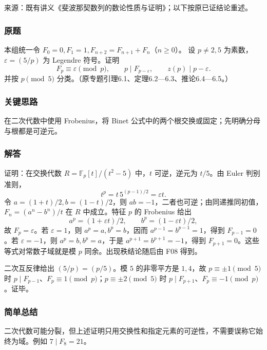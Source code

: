 \documentclass[11pt,a4paper]{article}
\begin{document}
来源：既有讲义《斐波那契数列的数论性质与证明》；以下按原已证结论重述。

\subsubsection{原题}\label{ux539fux9898-41}

本组统一令 \(F_0=0,F_1=1,F_{n+2}=F_{n+1}+F_n\)（\(n\ge0\)）。 设
\(p\ne2,5\) 为素数，\(\varepsilon=(5/p)\) 为 Legendre 符号。证明
\[F_p\equiv\varepsilon\pmod p,\qquad p\mid F_{p-\varepsilon},\qquad z(p)\mid p-\varepsilon.\]
并按 \(p\pmod5\) 分类。（原专题引理6.1、定理6.2---6.3、推论6.4---6.5。）

\subsubsection{关键思路}\label{ux5173ux952eux601dux8def-41}

在二次代数中使用 Frobenius，将 Binet
公式中的两个根交换或固定；先明确分母与根都是可逆元。

\subsubsection{解答}\label{ux89e3ux7b54-41}

证明：在交换代数 \(R=\mathbb F_p[t]/(t^2-5)\) 中，\(t\) 可逆，逆元为
\(t/5\)。由 Euler 判别准则， \[t^p=t\,5^{(p-1)/2}=\varepsilon t.\] 令
\(a=(1+t)/2,b=(1-t)/2\)，则
\(ab=-1\)，二者也可逆；由同递推同初值，\(F_n=(a^n-b^n)/t\) 在 \(R\)
中成立。特征 \(p\) 的 Frobenius 给出
\[a^p=(1+\varepsilon t)/2,\qquad b^p=(1-\varepsilon t)/2,\] 故
\(F_p=\varepsilon\)。若 \(\varepsilon=1\)，则 \(a^p=a,b^p=b\)，因而
\(a^{p-1}=b^{p-1}=1\)，得到 \(F_{p-1}=0\)。若 \(\varepsilon=-1\)，则
\(a^p=b,b^p=a\)，于是 \(a^{p+1}=b^{p+1}=-1\)，得到
\(F_{p+1}=0\)。这些等式对常数子域就是模 \(p\) 同余。出现秩结论随后由 F08
得到。

二次互反律给出 \((5/p)=(p/5)\)。模 \(5\) 的非零平方是 \(1,4\)，故
\(p\equiv\pm1\pmod5\) 时
\(p\mid F_{p-1}\)、\(F_p\equiv1\pmod p\)；\(p\equiv\pm2\pmod5\) 时
\(p\mid F_{p+1}\)、\(F_p\equiv-1\pmod p\)。证毕。

\subsubsection{简单总结}\label{ux7b80ux5355ux603bux7ed3-41}

二次代数可能分裂，但上述证明只用交换性和指定元素的可逆性，不需要误称它始终为域。例如
\(7\mid F_8=21\)。
\end{document}
